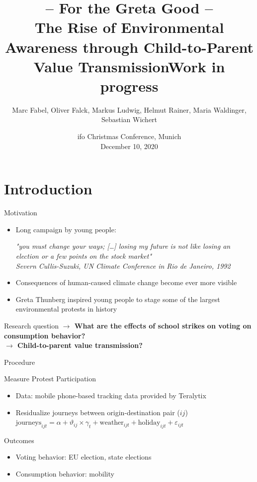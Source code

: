 \documentclass[usenames,dvipsnames]{beamer} %
\title[Soccer and Crime]{  \textbf{-- For the Greta Good -- \\ The Rise of Environmental Awareness through Child-to-Parent Value Transmission}\newline Work in progress}
\author[Marc Fabel]{Marc Fabel, Oliver Falck, Markus Ludwig, Helmut Rainer, Maria Waldinger, Sebastian Wichert}
\date{ifo Christmas Conference, Munich\\December 10, 2020}
\begin{document}
\begin{frame}
	\titlepage
\end{frame}




\section{Introduction}
	\begin{frame}{Motivation}
		\begin{itemize}
			\item Long campaign by young people:
			
			\textit{"you must change your ways; […] losing my future is not like losing an election or a few points on the stock market"\\ {\footnotesize Severn Cullis-Suzuki, UN Climate Conference in Rio de Janeiro, 1992}}
			 
			\item Consequences of human-caused climate change become ever more visible
			\item Greta Thunberg inspired young people to stage some of the largest environmental protests in history					
		\end{itemize}


		\begin{block}{Research question}
			\textbf{$\rightarrow$ What are the effects of school strikes on voting on consumption behavior? \\ $\rightarrow$ Child-to-parent value transmission?}
		\end{block}
	\end{frame}


\begin{frame}{Procedure}

\begin{block}{Measure Protest Participation}
	\begin{itemize}
		\item Data: mobile phone-based tracking data provided by Teralytix
		\item Residualize journeys between origin-destination pair ($ij$) \\ 
		$\text{journeys}_{ijt} = \alpha + \vartheta_{ij} \times \gamma_t + \text{weather}_{ijt} + \text{holiday}_{ijt} + \varepsilon_{ijt} $
	\end{itemize}
\end{block}	
	

\begin{block}{Outcomes}
	\begin{itemize}
		\item Voting behavior: EU election, state elections
		\item Consumption behavior: mobility 
	\end{itemize}
\end{block}	
	
	
\end{frame}
\end{document}
